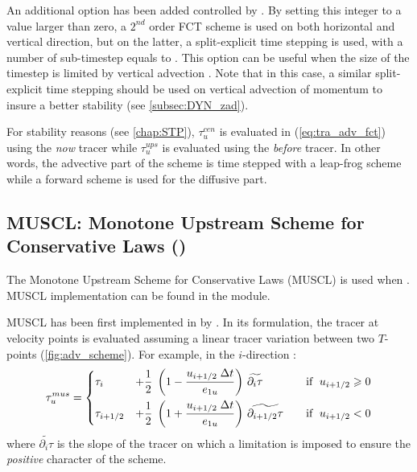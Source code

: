 \documentclass[../tex_main/NEMO_manual]{subfiles}
\begin{document}
An additional option has been added controlled by .
By setting this integer to a value larger than zero,
a $2^{nd}$ order FCT scheme is used on both horizontal and vertical direction, but on the latter,
a split-explicit time stepping is used, with a number of sub-timestep equals to .
This option can be useful when the size of the timestep is limited by vertical advection \citep{Lemarie_OM2015}.
Note that in this case, a similar split-explicit time stepping should be used on vertical advection of momentum to
insure a better stability (see \autoref{subsec:DYN_zad}).

For stability reasons (see \autoref{chap:STP}),
$\tau_u^{cen}$ is evaluated in (\autoref{eq:tra_adv_fct}) using the \textit{now} tracer while
$\tau_u^{ups}$ is evaluated using the \textit{before} tracer.
In other words, the advective part of the scheme is time stepped with a leap-frog scheme
while a forward scheme is used for the diffusive part. 

\subsection{MUSCL: Monotone Upstream Scheme for Conservative Laws (\protect{})}
\label{subsec:TRA_adv_mus}

The Monotone Upstream Scheme for Conservative Laws (MUSCL) is used when .
MUSCL implementation can be found in the  module.

MUSCL has been first implemented in \NEMO by \citet{Levy_al_GRL01}.
In its formulation, the tracer at velocity points is evaluated assuming a linear tracer variation between
two $T$-points (\autoref{fig:adv_scheme}).
For example, in the $i$-direction :
\begin{equation} \label{eq:tra_adv_mus}
   \tau_u^{mus} = \left\{      \begin{aligned}
         &\tau_i  &+ \frac{1}{2} \;\left( 1-\frac{u_{i+1/2} \;\Delta t}{e_{1u}} \right)
         &\ \widetilde{\partial _i \tau}  & \quad \text{if }\;u_{i+1/2} \geqslant 0      \\
         &\tau_{i+1/2} &+\frac{1}{2}\;\left( 1+\frac{u_{i+1/2} \;\Delta t}{e_{1u} } \right)
         &\ \widetilde{\partial_{i+1/2} \tau } & \text{if }\;u_{i+1/2} <0
   \end{aligned}    \right.
\end{equation}
where $\widetilde{\partial _i \tau}$ is the slope of the tracer on which a limitation is imposed to
ensure the \textit{positive} character of the scheme.
\end{document}
